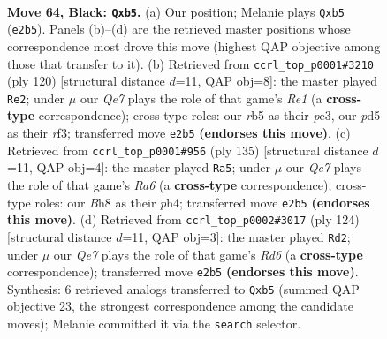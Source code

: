 \documentclass[11pt]{article}
\begin{document}
\clearpage

\begin{figure}[p]\centering
\begin{subfigure}{0.46\textwidth}\centering
\resizebox{\linewidth}{!}{%
\newchessgame
\chessboard[
  setfen={5k1b/5p2/8/1R1P4/8/7K/4q3/8 b - - 6 64},
  showmover=false,
  pgfstyle=straightmove, color=movearrow, markmove={e2-b5}
]}
\caption{}
\end{subfigure}\hfill
\begin{subfigure}{0.46\textwidth}\centering
\resizebox{\linewidth}{!}{%
\newchessgame
\chessboard[
  setfen={8/4k3/8/4p1P1/7K/4pr2/8/4R3 w - - 0 61},
  showmover=false,
  pgfstyle=straightmove, color=movearrow, markmove={e1-e2}
]}
\caption{}
\end{subfigure}
\\[4pt]
\begin{subfigure}{0.46\textwidth}\centering
\resizebox{\linewidth}{!}{%
\newchessgame
\chessboard[
  setfen={8/6k1/6p1/8/4R1PP/r7/6K1/8 b - - 15 68},
  showmover=false,
  pgfstyle=straightmove, color=movearrow, markmove={a3-a5}
]}
\caption{}
\end{subfigure}\hfill
\begin{subfigure}{0.46\textwidth}\centering
\resizebox{\linewidth}{!}{%
\newchessgame
\chessboard[
  setfen={8/8/3R3p/8/2k2KP1/7r/8/8 w - - 4 63},
  showmover=false,
  pgfstyle=straightmove, color=movearrow, markmove={d6-d2}
]}
\caption{}
\end{subfigure}
\caption{\textbf{Move 64, Black: \texttt{Qxb5}.} (a) Our position; Melanie plays \texttt{Qxb5} (\texttt{e2b5}). Panels (b)--(d) are the retrieved master positions whose correspondence most drove this move (highest QAP objective among those that transfer to it). (b) Retrieved from \texttt{ccrl\_top\_p0001\#3210} (ply 120) [structural distance $d$=11, QAP obj=8]: the master played \texttt{Re2}; under $\mu$ our \emph{Qe7} plays the role of that game's \emph{Re1} (a \textbf{cross-type} correspondence); cross-type roles: our \emph{r}b5 as their \emph{p}e3, our \emph{p}d5 as their \emph{r}f3; transferred move \texttt{e2b5} \textbf{(endorses this move)}. (c) Retrieved from \texttt{ccrl\_top\_p0001\#956} (ply 135) [structural distance $d$=11, QAP obj=4]: the master played \texttt{Ra5}; under $\mu$ our \emph{Qe7} plays the role of that game's \emph{Ra6} (a \textbf{cross-type} correspondence); cross-type roles: our \emph{B}h8 as their \emph{p}h4; transferred move \texttt{e2b5} \textbf{(endorses this move)}. (d) Retrieved from \texttt{ccrl\_top\_p0002\#3017} (ply 124) [structural distance $d$=11, QAP obj=3]: the master played \texttt{Rd2}; under $\mu$ our \emph{Qe7} plays the role of that game's \emph{Rd6} (a \textbf{cross-type} correspondence); transferred move \texttt{e2b5} \textbf{(endorses this move)}. Synthesis: 6 retrieved analogs transferred to \texttt{Qxb5} (summed QAP objective 23, the strongest correspondence among the candidate moves); Melanie committed it via the \texttt{search} selector.}
\label{fig:thought-m127}
\end{figure}
\end{document}
